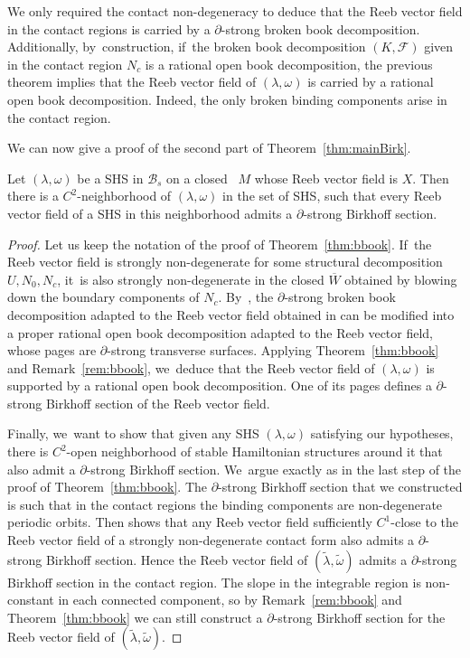 \begin{Remark} \label{rem:bbook}
We only required the contact non-degeneracy to deduce that the Reeb vector field in the contact regions is carried by a $\partial$-strong broken book decomposition. Additionally, by~construction, if~the broken book decomposition $(K,\mathcal{F})$ given in the contact region $N_c$ is a rational open book decomposition, the previous theorem implies that the Reeb vector field of $(\lambda,\omega)$ is carried by a rational open book decomposition. Indeed, the only broken binding components arise in the contact region.
\end{Remark}

We can now give a proof of the second part of Theorem~\ref{thm:mainBirk}.

\begin{theorem}\label{thm:Bsection}
Let $(\lambda,\omega)$ be a SHS in $\mathcal{B}_s$ on a closed \threemanifold~$M$ whose Reeb vector field is $X$.
Then there is a $C^2$-neighborhood of $(\lambda,\omega)$ in the set of SHS, such that every Reeb vector field of a SHS in this neighborhood admits a $\partial$-strong Birkhoff section.
\end{theorem}

\begin{proof}
Let us keep the notation of the proof of Theorem~\ref{thm:bbook}. If~the Reeb vector field is strongly non-degenerate for some structural decomposition $U, N_0, N_c$, it~is also strongly non-degenerate in the closed \threemanifold $\overline W$ obtained by blowing down the boundary components of $N_c$. By~\cite[Th.\,A]{CM}, the $\partial$-strong broken book decomposition adapted to the Reeb vector field obtained in \cite[Th.\,1.1]{CDR} can be modified into a proper rational open book decomposition adapted to the Reeb vector field, whose pages are $\partial$-strong transverse surfaces. Applying Theorem~\ref{thm:bbook} and Remark~\ref{rem:bbook}, we~deduce that the Reeb vector field of $(\lambda,\omega)$ is supported by a rational open book decomposition. One of its pages defines a $\partial$-strong Birkhoff section of the Reeb vector field.

Finally, we~want to show that given any SHS $(\lambda,\omega)$ satisfying our hypotheses, there is $C^2$-open neighborhood of stable Hamiltonian structures around it that also admit a $\partial$-strong Birkhoff section. We~argue exactly as in the last step of the proof of Theorem~\ref{thm:bbook}. The $\partial$-strong Birkhoff section that we constructed is such that in the contact regions the binding components are non-degenerate periodic orbits. Then \cite[Prop.\,5.1]{CDHR} shows that any Reeb vector field sufficiently $C^1$-close to the Reeb vector field of a strongly non-degenerate contact form also admits a $\partial$-strong Birkhoff section. Hence the Reeb vector field of
$(\widetilde \lambda, \widetilde \omega)$ admits a $\partial$-strong Birkhoff section in the contact region. The slope in the integrable region is non-constant in each connected component, so by Remark~\ref{rem:bbook} and Theorem~\ref{thm:bbook} we can still construct a $\partial$-strong Birkhoff section for the Reeb vector field of $(\widetilde \lambda, \widetilde \omega)$.
\end{proof}

